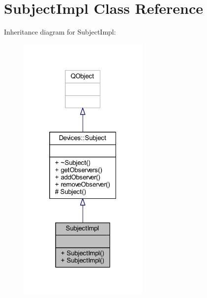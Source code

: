 \hypertarget{class_subject_impl}{}\section{Subject\+Impl Class Reference}
\label{class_subject_impl}


Inheritance diagram for Subject\+Impl\+:\nopagebreak
\begin{figure}[H]
\begin{center}
\leavevmode
\includegraphics[width=181pt]{de/d5e/class_subject_impl__inherit__graph}
\end{center}
\end{figure}


